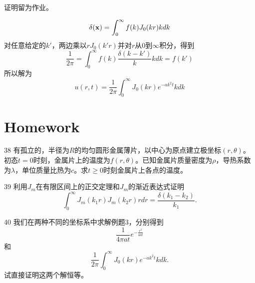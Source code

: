 \documentclass[CJK]{beamer}
\begin{document}
\begin{frame}
  \bch
  证明留为作业。
  \ech
\end{frame}


\begin{frame}
  \bch
  $$  \delta({\mathbf{x}}) = \int_0^\infty f(k) J_0(kr)k dk $$
  对任意给定的$k'$，两边乘以$rJ_0(k'r)$并对$r$从$0$到$\infty$积分，得到
  $$ \frac{1}{2\pi} = \int_0^\infty f(k)\frac{\delta(k-k')}{k} k dk =f(k')$$
  所以解为
  $$  u(r, t) = \frac{1}{2\pi} \int_0^\infty J_0(kr)e^{-ak^2t} k dk $$  
  \ech
\end{frame}



\section{Homework}

\begin{frame}
  \bch
  \bitem
\item[38]{  有孤立的，半径为$R$的均匀圆形金属薄片，以中心为原点建立极坐标$(r,\theta)$。初态$t=0$时刻，金属片上的温度为$f(r,\theta)$。已知金属片质量密度为$\rho$，导热系数为$\lambda$，单位质量比热为$c$。求$t\ge 0$时刻金属片上各点的温度。}
\item[39]{利用$J_m$在有限区间上的正交定理和$J_m$的渐近表达式证明
  $$ \int_0^\infty J_m(k_1r)J_m(k_2r) r dr = \frac{\delta(k_1-k_2)}{k_1}. $$ }
\item[40]{  
  我们在两种不同的坐标系中求解例题3，分别得到
  $$\frac{1}{4\pi at}e^{-\frac{r^2}{4at}}$$
  和
  $$ \frac{1}{2\pi} \int_0^\infty J_0(kr)e^{-ak^2t} k dk.$$
  试直接证明这两个解恒等。}
  \eitem
  \ech
\end{frame}
\end{document}
